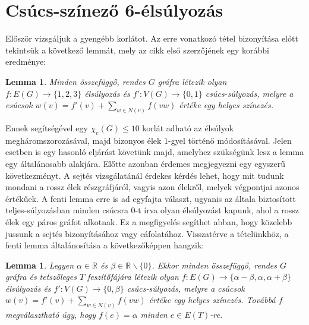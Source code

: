 \documentclass[12pt, a4paper]{report}
\newtheorem{lem}[tét]{Lemma}
\theoremstyle{remark}
\theoremstyle{definition}
\begin{document}
\section{Csúcs-színező 6-élsúlyozás}
Először vizsgáljuk a gyengébb korlátot. Az erre vonatkozó tétel bizonyítása előtt tekintsük a következő lemmát, mely az \cite{Kalkowski2009} cikk első szerzőjének egy korábbi eredménye:

\begin{lem}
Minden összefüggő, rendes $G$ gráfra létezik olyan $f:E(G) \rightarrow \lbrace 1, 2, 3 \rbrace$ élsúlyozás és $f':V(G) \rightarrow \lbrace 0, 1 \rbrace$ csúcs-súlyozás, melyre a csúcsok $w(v) = f'(v) + \sum\limits_{w \in N(v)} f(vw)$ értéke egy helyes színezés.
\end{lem}

Ennek segítségével egy $\chi_e(G) \leq 10$ korlát adható az élsúlyok megháromszorozásával, majd bizonyos élek $1$-gyel történő módosításával. Jelen esetben is egy hasonló eljárást követünk majd, amelyhez szükségünk lesz a lemma egy általánosabb alakjára. Előtte azonban érdemes megjegyezni egy egyszerű következményt. A sejtés vizsgálatánál érdekes kérdés lehet, hogy mit tudunk mondani a rossz élek részgráfjáról, vagyis azon élekről, melyek végpontjai azonos értékűek. A fenti lemma erre is ad egyfajta választ, ugyanis az általa biztosított teljes-súlyozásban minden csúcsra $0$-t írva olyan élsúlyozást kapunk, ahol a rossz élek egy páros gráfot alkotnak. Ez a megfigyelés segíthet abban, hogy közelebb jussunk a sejtés bizonyításához vagy cáfolatához. Visszatérve a tételünkhöz, a fenti lemma általánosítása a következőképpen hangzik:

\begin{lem} \label{lem:edge6treemixed}
Legyen $\alpha \in \mathbb{R}$ és $\beta \in \mathbb{R} \smallsetminus \lbrace 0 \rbrace$. Ekkor minden összefüggő, rendes $G$ gráfra és tetszőleges $T$ feszítőfájára létezik olyan $f:E(G) \rightarrow \lbrace \alpha - \beta, \alpha, \alpha + \beta \rbrace$ élsúlyozás és $f':V(G) \rightarrow \lbrace 0, \beta \rbrace$ csúcs-súlyozás, melyre a csúcsok $w(v) = f'(v) + \sum\limits_{w \in N(v)} f(vw)$ értéke egy helyes színezés. Továbbá $f$ megválasztható úgy, hogy $f(e) = \alpha$ minden $e \in E(T)$-re.
\end{lem}
\end{document}

